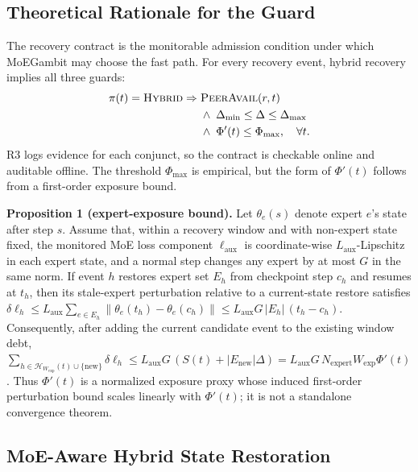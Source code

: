 \documentclass[10pt,conference]{IEEEtran}
\begin{document}
\subsection{Theoretical Rationale for the Guard}
\label{sec:guard-rationale}

The recovery contract is the monitorable admission condition under which MoEGambit may choose the fast path. For every recovery event, hybrid recovery implies all three guards:
\begin{equation}
\label{eq:runtime-contract}
\begin{aligned}
\pi(t)=\textsc{Hybrid} \Rightarrow{}&
\textsc{PeerAvail}(r,t)\\
&{}\wedge\;\Delta_{\min}\leq\Delta\leq\Delta_{\max}\\
&{}\wedge\;\Phi'(t)\leq\Phi_{\max},\quad \forall t.
\end{aligned}
\end{equation}
R3 logs evidence for each conjunct, so the contract is checkable online and auditable offline. The threshold $\Phi_{\max}$ is empirical, but the form of $\Phi'(t)$ follows from a first-order exposure bound.

\noindent\textbf{Proposition 1 (expert-exposure bound).}
Let $\theta_e(s)$ denote expert $e$'s state after step $s$. Assume that, within a recovery window and with non-expert state fixed, the monitored MoE loss component $\ell_{\text{aux}}$ is coordinate-wise $L_{\text{aux}}$-Lipschitz in each expert state, and a normal step changes any expert by at most $G$ in the same norm. If event $h$ restores expert set $E_h$ from checkpoint step $c_h$ and resumes at $t_h$, then its stale-expert perturbation relative to a current-state restore satisfies
$\delta\ell_h \leq L_{\text{aux}}\sum_{e\in E_h}\|\theta_e(t_h)-\theta_e(c_h)\| \leq L_{\text{aux}}G\,|E_h|\,(t_h-c_h)$.
Consequently, after adding the current candidate event to the existing window debt,
$\sum_{h\in\mathcal{H}_{W_{\mathrm{exp}}}(t)\cup\{\text{new}\}}\delta\ell_h \leq L_{\text{aux}}G\,(S(t)+|E_{\text{new}}|\Delta)=L_{\text{aux}}G\,N_{\text{expert}}W_{\mathrm{exp}}\Phi'(t)$.
Thus $\Phi'(t)$ is a normalized exposure proxy whose induced first-order perturbation bound scales linearly with $\Phi'(t)$; it is not a standalone convergence theorem.

\subsection{MoE-Aware Hybrid State Restoration}
\label{sec:mechanism}
\end{document}
